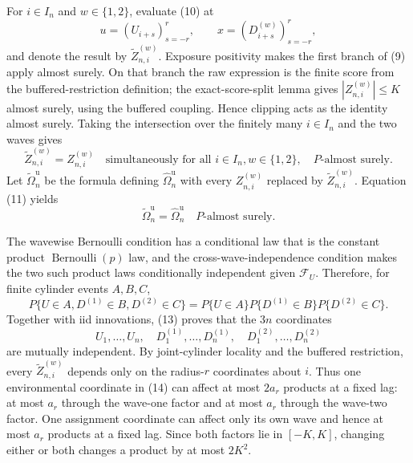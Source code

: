 For \(i\in I_n\) and \(w\in\{1,2\}\), evaluate (10) at
\[
 u=(U_{i+s})_{s=-r}^r,
 \qquad x=(D_{i+s}^{(w)})_{s=-r}^r,
\]
and denote the result by \(\widetilde Z_{n,i}^{(w)}\).  Exposure positivity makes the first branch of (9) apply almost surely.  On that branch the raw expression is the finite score from the buffered-restriction definition; the exact-score-split lemma gives \(|Z_{n,i}^{(w)}|\le K\) almost surely, using the buffered coupling.  Hence clipping acts as the identity almost surely.  Taking the intersection over the finitely many \(i\in I_n\) and the two waves gives
\[
 \widetilde Z_{n,i}^{(w)}=Z_{n,i}^{(w)}
 \quad\text{simultaneously for all }i\in I_n, w\in\{1,2\},
 \quad P\text{-almost surely}. \tag{11}
\]
Let \(\widetilde\Omega_n^{\mathrm u}\) be the formula defining \(\widehat\Omega_n^{\mathrm u}\) with every \(Z_{n,i}^{(w)}\) replaced by \(\widetilde Z_{n,i}^{(w)}\).  Equation (11) yields
\[
 \widetilde\Omega_n^{\mathrm u}=\widehat\Omega_n^{\mathrm u}
 \quad P\text{-almost surely}. \tag{12}
\]

The wavewise Bernoulli condition has a conditional law that is the constant product \(\operatorname{Bernoulli}(p)\) law, and the cross-wave-independence condition makes the two such product laws conditionally independent given \(\mathcal F_U\).  Therefore, for finite cylinder events \(A,B,C\),
\[
 P\{U\in A,D^{(1)}\in B,D^{(2)}\in C\}
 =P\{U\in A\}P\{D^{(1)}\in B\}P\{D^{(2)}\in C\}. \tag{13}
\]
Together with iid innovations, (13) proves that the \(3n\) coordinates
\[
 U_1,\ldots,U_n,
 \quad D_1^{(1)},\ldots,D_n^{(1)},
 \quad D_1^{(2)},\ldots,D_n^{(2)} \tag{14}
\]
are mutually independent.  By joint-cylinder locality and the buffered restriction, every \(\widetilde Z_{n,i}^{(w)}\) depends only on the radius-\(r\) coordinates about \(i\).  Thus one environmental coordinate in (14) can affect at most \(2a_r\) products at a fixed lag: at most \(a_r\) through the wave-one factor and at most \(a_r\) through the wave-two factor.  One assignment coordinate can affect only its own wave and hence at most \(a_r\) products at a fixed lag.  Since both factors lie in \([-K,K]\), changing either or both changes a product by at most \(2K^2\).

